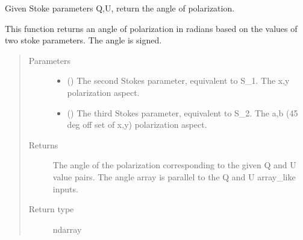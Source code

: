 \documentclass[letterpaper,10pt,english]{sphinxmanual}
\begin{document}

\begin{fulllineitems}
\label{\detokenize{Backend.electromagnetic_field_polarization:Backend.electromagnetic_field_polarization.angle_from_Stokes_parameters}}
Given Stoke parameters Q,U, return the angle of polarization.

This function returns an angle of polarization in radians based on the
values of two stoke parameters. The angle is signed.
\begin{quote}\begin{description}
\item[{Parameters}] \leavevmode\begin{itemize}
\item {} 
 () \textendash{} The second Stokes parameter, equivalent to S\_1. The x,y polarization
aspect.

\item {} 
 () \textendash{} The third Stokes parameter, equivalent to S\_2. The a,b (45 deg off set
of x,y) polarization aspect.

\end{itemize}

\item[{Returns}] \leavevmode
{} \textendash{} The angle of the polarization corresponding to the given Q and U value
pairs. The angle array is parallel to the Q and U array\_like inputs.

\item[{Return type}] \leavevmode
ndarray

\end{description}\end{quote}

\end{fulllineitems}

\end{document}
